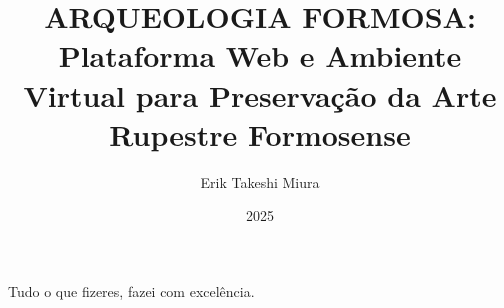 \documentclass[pt,twoside,onehalfspacing,bsc]{ifgtcc}
\title{
ARQUEOLOGIA FORMOSA:
Plataforma Web e Ambiente Virtual para 
Preservação da Arte Rupestre Formosense 
}
\date{2025}
\author{Erik Takeshi Miura}
\begin{document}
\frontmatter
\frontpage
\presentationpage

\begin{fichacatalografica}
\FakeFichaCatalografica %
%
\end{fichacatalografica}

\begin{dedicatory}
Tudo o que fizeres, fazei com excelência.
\end{dedicatory}

\acknowledgements



\resumo


\abstract


\tableofcontents

\listoffigures
{}
\listoftables
{}
 
\printglossary[type=\acronymtype, title={Acrônimos}] %

\mainmatter








\begin{references}

\end{references}

\theappendix

\end{document}
